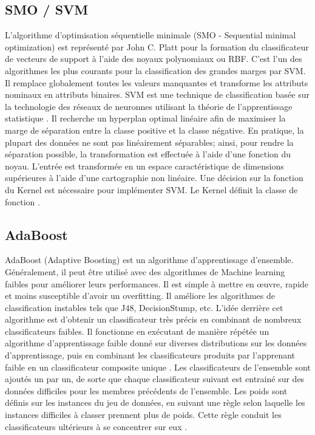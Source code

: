 \subsection{SMO / SVM}
L'algorithme d'optimisation séquentielle minimale (SMO - Sequential minimal optimization) \cite{ML29} est représenté par John C. Platt pour la formation du classificateur de vecteurs de support à l'aide des noyaux polynomiaux ou RBF. C'est l'un des algorithmes les plus courants pour la classification des grandes marges par SVM. Il remplace globalement toutes les valeurs manquantes et transforme les attributs nominaux en attributs binaires. SVM est une technique de classification basée sur la technologie des réseaux de neuronnes utilisant la théorie de l'apprentissage statistique \cite{ML30}. Il recherche un hyperplan optimal linéaire afin de maximiser la marge de séparation entre la classe positive et la classe négative. En pratique, la plupart des données ne sont pas linéairement séparables; ainsi, pour rendre la séparation possible, la transformation est effectuée à l'aide d'une fonction du noyau. L'entrée est transformée en un espace caractéristique de dimensions supérieures à l'aide d'une cartographie non linéaire. Une décision sur la fonction du Kernel est nécessaire pour implémenter SVM. Le Kernel définit la classe de fonction \cite{ML31}.

\subsection{AdaBoost}
AdaBoost (Adaptive Boosting) \cite{ML32} est un algorithme d'apprentissage d'ensemble. Généralement, il peut être utilisé avec des algorithmes de Machine learning faibles pour améliorer leurs performances. Il est simple à mettre en œuvre, rapide et moins susceptible d'avoir un overfitting. Il améliore les algorithmes de classification instables tels que J48, DecisionStump, etc. L'idée derrière cet algorithme est d'obtenir un classificateur très précis en combinant de nombreux classificateurs faibles. Il fonctionne en exécutant de manière répétée un algorithme d'apprentissage faible donné sur diverses distributions sur les données d'apprentissage, puis en combinant les classificateurs produits par l'apprenant faible en un classificateur composite unique \cite{ML33}. Les classificateurs de l'ensemble sont ajoutés un par un, de sorte que chaque classificateur suivant est entrainé sur des données difficiles pour les membres précédents de l'ensemble. Les poids sont définis sur les instances du jeu de données, en suivant une règle selon laquelle les instances difficiles à classer prennent plus de poids. Cette règle conduit les classificateurs ultérieurs à se concentrer sur eux \cite{ML34}.

